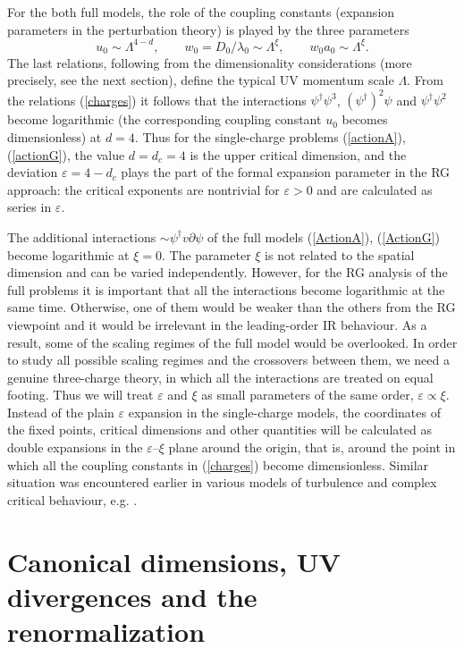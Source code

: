 \documentclass[12pt]{iopart}
\begin{document}
For the both full models, the role of the coupling constants (expansion
parameters in the perturbation theory) is played by the three parameters
\begin{equation}
u_{0}  \sim \Lambda^{4-d}, \qquad
w_{0} = D_{0}/\lambda_{0} \sim \Lambda^{\xi},
\qquad w_{0}a_{0} \sim \Lambda^{\xi}.
\label{charges}
\end{equation}
The last relations, following from the dimensionality considerations
(more precisely, see the next section), define the typical UV momentum
scale $\Lambda$. From the relations (\ref{charges}) it follows that the
interactions $\psi^{\dagger}\psi^{3}$, $(\psi^{\dagger})^2\psi$ and
$\psi^{\dagger}\psi^2$ become logarithmic (the corresponding coupling
constant $u_{0}$ becomes dimensionless) at $d=4$.
Thus for the single-charge problems (\ref{actionA}), (\ref{actionG}),
the value $d=d_{c}=4$ is
the upper critical dimension, and the deviation $\varepsilon=4-d_{c}$ plays the
part of the formal expansion parameter in the RG approach: the critical
exponents are nontrivial for $\varepsilon>0$ and are calculated as series in
$\varepsilon$.

The additional interactions $\sim \psi^{\dag} v\partial \psi $
of the full models (\ref{ActionA}), (\ref{ActionG})
become logarithmic at $\xi=0$. The parameter $\xi$ is not
related to the spatial dimension and can be varied independently. However,
for the RG analysis of the full problems it is important that
all the interactions become logarithmic at the same time. Otherwise, one
of them would be weaker than the others from the RG viewpoint and it would
be irrelevant in the leading-order IR behaviour. As a result, some of the
scaling regimes of the full model would be overlooked.
In order to study all possible scaling regimes and the crossovers between
them, we need a genuine three-charge theory, in which all the interactions
are treated on equal footing. Thus we will treat $\varepsilon$ and $\xi$ as
small parameters of the same order, $\varepsilon \propto \xi$.
Instead of the plain $\varepsilon$ expansion in the single-charge models,
the coordinates of the fixed points, critical dimensions
and other quantities will be calculated as double expansions in the
$\varepsilon$--$\xi$ plane around the origin, that is, around the point in which
all the coupling constants in (\ref{charges}) become dimensionless.
Similar situation was encountered earlier in various models of turbulence
and complex critical behaviour, e.g. \cite{AHH,Alexa,AIK,AIM,Sak}.


\section{Canonical dimensions, UV divergences and the renormalization}
\label{sec:Reno}
\end{document}
